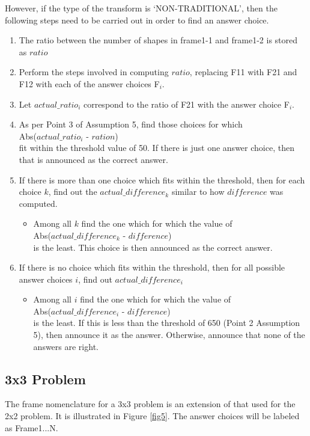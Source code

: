 \documentclass[10pt, letter]{article}
\begin{document}
However, if the type of the transform is `NON-TRADITIONAL', then the following steps need to be carried out in order to find an answer choice.
\begin{enumerate}
	\item The ratio between the number of shapes in frame1-1 and frame1-2 is stored as $ratio$
	\item Perform the steps involved in computing $ratio$, replacing F11 with F21 and F12 with each of the answer choices F$_i$.
	\item Let $actual\_ratio_i$ correspond to the ratio of F21 with the answer choice F$_i$.
	\item As per Point 3 of Assumption 5, find those choices for which \\
				\hspace*{3cm} Abs($actual\_ratio_i$ - $ration$)\\	
	 fit within the threshold value of 50. If there is just one answer choice, then that is announced as the correct answer.
	\item If there is more than one choice which fits within the threshold, then for each choice $k$, find out the $actual\_difference_k$ similar to how $difference$ was computed.
		\begin{itemize}
			\item Among all $k$ find the one which for which the value of \\
				\hspace*{3cm} Abs($actual\_difference_k$ - $difference$) \\
			is the least. This choice is then announced as the correct answer.
		\end{itemize}
	\item If there is no choice which fits within the threshold, then for all possible answer choices $i$, find out $actual\_difference_i$ 
		\begin{itemize}
		\item Among all $i$ find the one which for which the value of \\
				\hspace*{3cm} Abs($actual\_difference_i$ - $difference$) \\
			is the least. If this is less than the threshold of 650 (Point 2 Assumption 5), then announce it as the answer. Otherwise, announce that none of the answers are right.
		\end{itemize}
\end{enumerate}

\subsection*{3x3 Problem}
The frame nomenclature for a 3x3 problem is an extension of that used for the 2x2 problem. It is illustrated in Figure \ref{fig5}. The answer choices will be labeled as Frame1...N.
\end{document}
